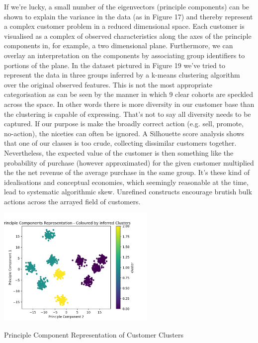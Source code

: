 \documentclass{tufte-handout}
\begin{document}
\noindent If we're lucky, a small number of the eigenvectors (principle components) can be shown to explain the variance in the data (as in Figure 17) and thereby represent a complex customer problem in a reduced dimensional space. Each customer is visualised as a complex of observed characteristics along the axes of the principle components in, for example, a two dimensional plane. Furthermore, we can overlay an interpretation on the components by associating group identifiers to portions of the plane. In the dataset pictured in Figure 19 we've tried to represent the data in three groups inferred by a k-means clustering algorithm over the original observed features. This is not the most appropriate categorisation as can be seen by the manner in which 9 clear cohorts are speckled across the space. In other words there is more diversity in our customer base than the clustering is capable of expressing. That's not to say all diversity needs to be captured. If our purpose is make the broadly correct action (e.g. sell, promote, no-action), the niceties can often be ignored. A Silhouette score analysis shows that one of our classes is too crude, collecting dissimilar customers together. Nevertheless, the expected value of the customer is then something like the probability of purchase (however approximated) for the given customer multiplied the the net revenue of the average purchase in the same group. It's these kind of idealisations and conceptual economies, which seemingly reasonable at the time, lead to systematic algorithmic skew. Unrefined constructs encourage brutish bulk actions across the arrayed field of customers. 
\linebreak

\begin{marginfigure}
\includegraphics[width=3in, height=5.in]{Plots/pca_representing_clusters.png}
\caption{Principle Component Representation of Customer Clusters}
\end{marginfigure}
\end{document}
